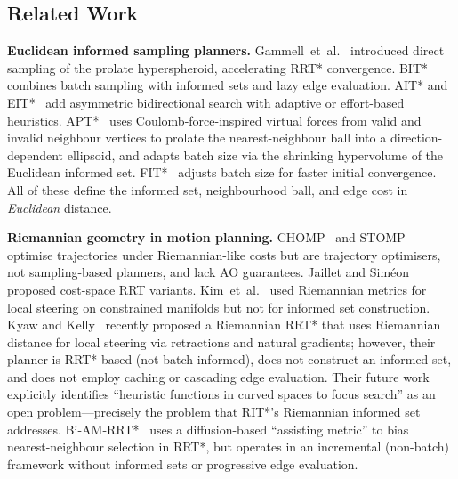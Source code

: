 \documentclass[journal]{IEEEtran}
\begin{document}
\subsection{Related Work}\label{sec:related}

\textbf{Euclidean informed sampling planners.}
Gammell~et~al.~\cite{Gammell2018} introduced direct sampling of the
prolate hyperspheroid, accelerating RRT* convergence.
BIT*~\cite{Gammell2020} combines batch sampling with informed sets and
lazy edge evaluation.  AIT* and EIT*~\cite{Strub2022} add asymmetric
bidirectional search with adaptive or effort-based heuristics.
APT*~\cite{APT2025} uses Coulomb-force-inspired virtual forces from
valid and invalid neighbour vertices to prolate the nearest-neighbour
ball into a direction-dependent ellipsoid, and adapts batch size via
the shrinking hypervolume of the Euclidean informed set.
FIT*~\cite{FIT2024} adjusts batch size for faster initial convergence.
All of these define the informed set, neighbourhood ball, and edge cost
in \emph{Euclidean} distance.

\textbf{Riemannian geometry in motion planning.}
CHOMP~\cite{Ratliff2009} and STOMP~\cite{Zucker2013} optimise
trajectories under Riemannian-like costs but are trajectory optimisers,
not sampling-based planners, and lack AO guarantees.
Jaillet and Sim\'{e}on~\cite{Jaillet2008} proposed cost-space RRT
variants. Kim~et~al.~\cite{Kim2016} used Riemannian metrics for local
steering on constrained manifolds but not for informed set construction.
Kyaw and Kelly~\cite{Kyaw2026} recently proposed a Riemannian RRT*
that uses Riemannian distance for local steering via retractions and
natural gradients; however, their planner is RRT*-based (not
batch-informed), does not construct an informed set, and does not employ
caching or cascading edge evaluation. Their future work explicitly
identifies ``heuristic functions in curved spaces to focus search'' as
an open problem---precisely the problem that RIT*'s Riemannian informed
set addresses.
Bi-AM-RRT*~\cite{Zhang2023biamrrt} uses a diffusion-based
``assisting metric'' to bias nearest-neighbour selection in RRT*, but
operates in an incremental (non-batch) framework without informed sets
or progressive edge evaluation.
\end{document}
